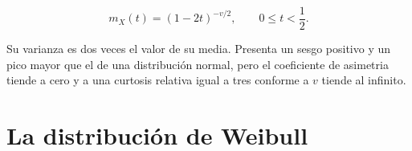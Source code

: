 \begin{tcolorbox}
    $$m_X(t)=(1-2t)^{-v/2},\qquad 0\leq t<\dfrac{1}{2}.$$
\end{tcolorbox}

Su varianza es dos veces el valor de su media. Presenta un sesgo positivo y un pico mayor que el de una distribución normal, pero el coeficiente de asimetria tiende a cero y a una curtosis relativa igual a tres conforme a $v$ tiende al infinito.

\section{La distribución de Weibull}




